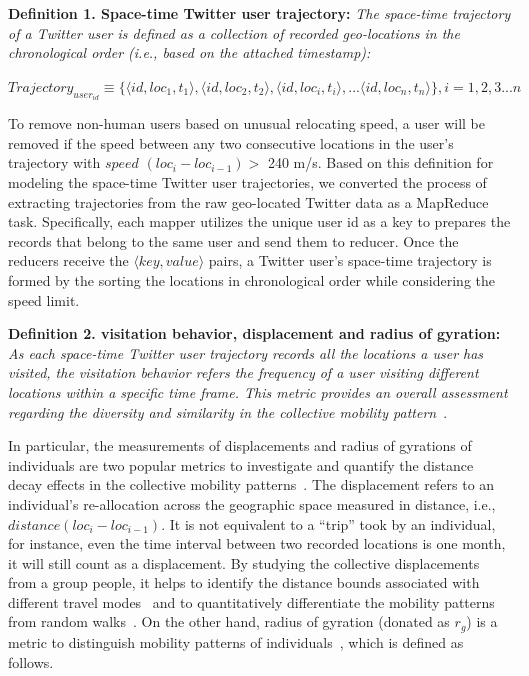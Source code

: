 \documentclass[ijgi,article,accept,moreauthors,pdftex,10pt,a4paper]{mdpi}
\theoremstyle{mdpi}
\newcounter{ex}
\newcounter{re}
\theoremstyle{mdpidefinition}
\begin{document}
\noindent\textbf{Definition 1. Space-time Twitter user trajectory:} \emph{The space-time trajectory of a Twitter user is defined as a collection of recorded geo-locations in the chronological order (i.e., based on the attached timestamp):} 
\newline

$Trajectory_{user_{id}} \equiv \lbrace \langle id, loc_{1}, t_{1}\rangle, \langle id, loc_{2}, t_{2}\rangle, \langle id, loc_{i}, t_{i}\rangle, ... \langle id, loc_{n}, t_{n}\rangle \rbrace, i = 1, 2, 3...n$
\newline

To remove non-human users based on unusual relocating speed, a user will be removed if the speed between any two consecutive locations in the user's trajectory with $speed$ $(loc_{i} - loc_{i-1}) > $ 240 m/s.
Based on this definition for modeling the space-time Twitter user trajectories, we converted the process of extracting trajectories from the raw geo-located Twitter data as a MapReduce task. Specifically, each mapper utilizes the unique user id as a key to prepares the records that belong to the same user and send them to reducer. Once the reducers receive the $\langle key, value\rangle$ pairs, a Twitter user's space-time trajectory is formed by the sorting the locations in chronological order while considering the speed limit.
\newline

\noindent\textbf{Definition 2. visitation behavior, displacement and radius of gyration:} \emph{As each space-time Twitter user trajectory records all the locations a user has visited, the visitation behavior refers the frequency of a user visiting different locations within a specific time frame.
This metric provides an overall assessment regarding the diversity and similarity in the collective mobility pattern}~\cite{gao2012exploring}.

In particular, the measurements of displacements and radius of gyrations of individuals are two popular metrics to investigate and quantify the distance decay effects in the collective mobility patterns~\cite{gonzalez2008understanding}.
The displacement refers to an individual's re-allocation across the geographic space measured in distance, i.e., $distance (loc_{i} - loc_{i-1})$.
It is not equivalent to a ``trip'' took by an individual, for instance, even the time interval between two recorded locations is one month, it will still count as a displacement.
By studying the collective displacements from a group people, it helps to identify the distance bounds associated with different travel modes~\cite{Jurdak2015} and to quantitatively differentiate the mobility patterns from random walks~\cite{brockmann2006scaling}.
On the other hand, radius of gyration (donated as $r_{g}$) is a metric to distinguish mobility patterns of individuals~\cite{gonzalez2008understanding}, which is defined as follows.
\newline
\end{document}
